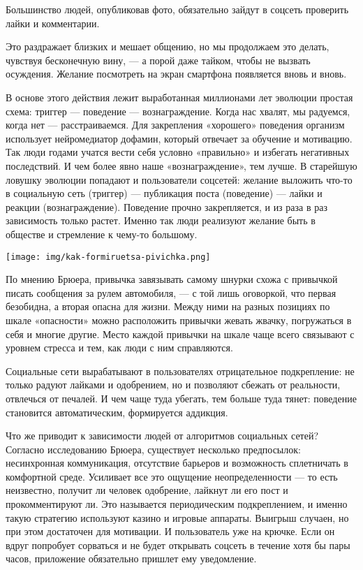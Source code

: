 \begin{fancyquotes}
    Большинство людей, опубликовав фото, обязательно зайдут в соцсеть проверить лайки и комментарии.
\end{fancyquotes}

Это раздражает близких и мешает общению, но мы продолжаем это делать, чувствуя бесконечную вину, — а порой даже тайком, чтобы не вызвать осуждения. Желание посмотреть на экран смартфона появляется вновь и вновь.

В основе этого действия лежит выработанная миллионами лет эволюции простая схема: триггер — поведение — вознаграждение. Когда нас хвалят, мы радуемся, когда нет — расстраиваемся. Для закрепления «хорошего» поведения организм использует нейромедиатор дофамин, который отвечает за обучение и мотивацию. Так люди годами учатся вести себя условно «правильно» и избегать негативных последствий. И чем более явно наше «вознаграждение», тем лучше. В старейшую ловушку эволюции попадают и пользователи соцсетей: желание выложить что-то в социальную сеть (триггер) — публикация поста (поведение) — лайки и реакции (вознаграждение). Поведение прочно закрепляется, и из раза в раз зависимость только растет. Именно так люди реализуют желание быть в обществе и стремление к чему-то большому.

\begin{center}
    \texttt{[image: img/kak-formiruetsa-pivichka.png]}
\end{center}

По мнению Брюера, привычка завязывать самому шнурки схожа с привычкой писать сообщения за рулем автомобиля, — с той лишь оговоркой, что первая безобидна, а вторая опасна для жизни. Между ними на разных позициях по шкале «опасности» можно расположить привычки жевать жвачку, погружаться в себя и многие другие. Место каждой привычки на шкале чаще всего связывают с уровнем стресса и тем, как люди с ним справляются.

\begin{fancyquotes}
    Социальные сети вырабатывают в пользователях отрицательное подкрепление: не только радуют лайками и одобрением, но и позволяют сбежать от реальности, отвлечься от печалей. И чем чаще туда убегать, тем больше туда тянет: поведение становится автоматическим, формируется аддикция.
\end{fancyquotes}

Что же приводит к зависимости людей от алгоритмов социальных сетей? Согласно исследованию Брюера, существует несколько предпосылок: несинхронная коммуникация, отсутствие барьеров и возможность сплетничать в комфортной среде. Усиливает все это ощущение неопределенности — то есть неизвестно, получит ли человек одобрение, лайкнут ли его пост и прокомментируют ли. Это называется периодическим подкреплением, и именно такую стратегию используют казино и игровые аппараты. Выигрыш случаен, но при этом достаточен для мотивации. И пользователь уже на крючке. Если он вдруг попробует сорваться и не будет открывать соцсеть в течение хотя бы пары часов, приложение обязательно пришлет ему уведомление.

